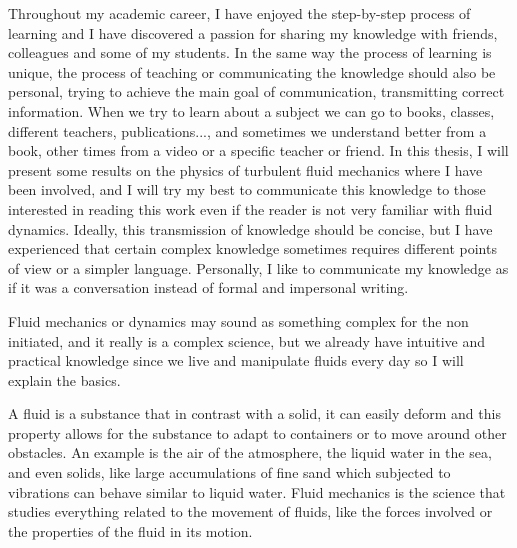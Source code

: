 Throughout my academic career, I have enjoyed the step-by-step process of learning and I have discovered a passion for sharing my knowledge with friends, colleagues and some of my students.
In the same way the process of learning is unique, the process of teaching or communicating the knowledge should also be personal, trying to achieve the main goal of communication, transmitting correct information.
When we try to learn about a subject we can go to books, classes, different teachers, publications..., and sometimes we understand better from a book, other times from a video or a specific teacher or friend.
In this thesis, I will present some results on the physics of turbulent fluid mechanics where I have been involved, and I will try my best to communicate this knowledge to those interested in reading this work even if the reader is not very familiar with fluid dynamics.
Ideally, this transmission of knowledge should be concise, but I have experienced that certain complex knowledge sometimes requires different points of view or a simpler language. Personally, I like to communicate my knowledge as if it was a conversation instead of formal and impersonal writing.

Fluid mechanics or dynamics may sound as something complex for the non initiated, and it really is a complex science, but we already have intuitive and practical knowledge since we live and manipulate fluids every day so I will explain the basics.

A fluid is a substance that in contrast with a solid, it can easily deform and this property allows for the substance to adapt to containers or to move around other obstacles. An example is the air of the atmosphere, the liquid water in the sea, and even solids, like large accumulations of fine sand which subjected to vibrations can behave similar to liquid water.
Fluid mechanics is the science that studies everything related to the movement of fluids, like the forces involved or the properties of the fluid in its motion.


